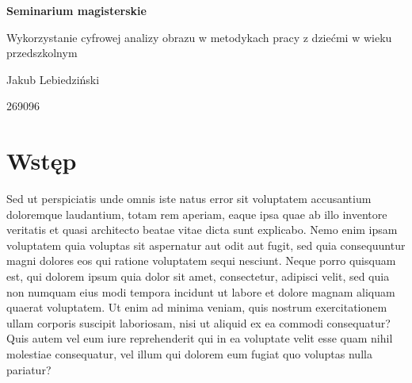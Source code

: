 \documentclass{article}
\begin{document}

\centerline{\textbf{\Large Seminarium magisterskie}}
\vspace{10mm}
{\Large Wykorzystanie cyfrowej analizy obrazu w metodykach pracy z dziećmi w wieku przedszkolnym}

\vspace{10mm}
\centerline{\large Jakub Lebiedziński} 
\vspace{1mm}
\centerline{\normalsize {269096}} 
\vspace{5mm} 

\linespread{1.3} %
\large %

\section*{\textbf{Wstęp}}
Sed ut perspiciatis unde omnis iste natus error sit voluptatem accusantium doloremque laudantium, totam rem aperiam, eaque ipsa quae ab illo inventore veritatis et quasi architecto beatae vitae dicta sunt explicabo. Nemo enim ipsam voluptatem quia voluptas sit aspernatur aut odit aut fugit, sed quia consequuntur magni dolores eos qui ratione voluptatem sequi nesciunt. Neque porro quisquam est, qui dolorem ipsum quia dolor sit amet, consectetur, adipisci velit, sed quia non numquam eius modi tempora incidunt ut labore et dolore magnam aliquam quaerat voluptatem. Ut enim ad minima veniam, quis nostrum exercitationem ullam corporis suscipit laboriosam, nisi ut aliquid ex ea commodi consequatur? Quis autem vel eum iure reprehenderit qui in ea voluptate velit esse quam nihil molestiae consequatur, vel illum qui dolorem eum fugiat quo voluptas nulla pariatur? \cite{ref1}
\par
\end{document}
